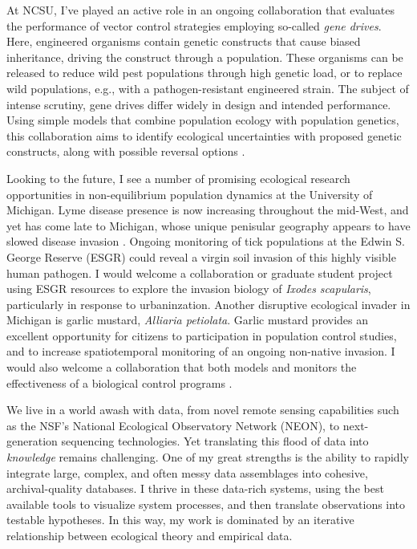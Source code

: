 \documentclass[12pt]{article}
\begin{document}
At NCSU, I've played an active role in an ongoing collaboration 
that evaluates the performance of vector control strategies employing 
so-called {\em gene drives}. Here, engineered organisms contain genetic 
constructs that cause biased inheritance, driving the construct through
a population.  These organisms can be released to
reduce wild pest populations through high genetic load, or to replace 
wild populations, e.g., with a pathogen-resistant engineered strain. 
The subject of intense scrutiny, gene drives differ 
widely in design and intended performance. Using simple models 
that combine population ecology with population genetics, this collaboration 
aims to identify ecological uncertainties with proposed genetic 
constructs, along with possible reversal options \citep{vella2016evaluating}.

Looking to the future, I see a number of promising ecological research
opportunities in non-equilibrium population dynamics at the University
of Michigan. Lyme disease presence is now increasing throughout the 
mid-West, and yet has come late to Michigan, whose unique
penisular geography appears to have slowed disease invasion \citep{hamer2010invasion}. 
Ongoing monitoring of tick populations at the Edwin S. George Reserve (ESGR)
could reveal a virgin soil invasion of this highly visible human pathogen.
I would welcome a collaboration or graduate student project using ESGR resources 
to explore the invasion biology of {\em Ixodes scapularis}, particularly in 
response to urbaninzation.  Another disruptive ecological invader in Michigan 
is garlic mustard, {\em Alliaria petiolata}. Garlic mustard provides an 
excellent opportunity for citizens to participation in 
population control studies, and to increase spatiotemporal 
monitoring of an ongoing non-native invasion. 
I would also welcome a collaboration that both models and 
monitors the effectiveness of a biological control programs \citep{evans2012importance}.

We live in a world awash with data, from novel remote sensing 
capabilities such as the NSF's National Ecological Observatory 
Network (NEON), to next-generation sequencing technologies.
Yet translating this flood of data into {\em knowledge} 
remains challenging.  One of my great strengths is the
ability to rapidly integrate large, complex, and often messy 
data assemblages into cohesive, archival-quality databases.
I thrive in these data-rich systems, using the best available 
tools to visualize system processes, and then
translate observations into testable hypotheses.
In this way, my work is dominated by an iterative relationship 
between ecological theory and empirical data. 
\end{document}

